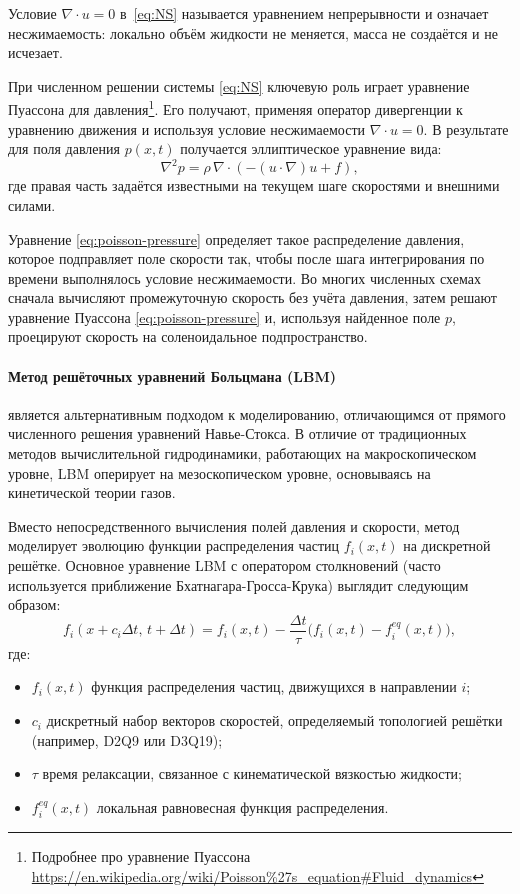 Условие \(\nabla\cdot u=0\) в~\eqref{eq:NS} называется уравнением
непрерывности и
означает несжимаемость: локально объём жидкости не меняется,
масса не создаётся и не исчезает.


При численном решении системы \eqref{eq:NS} ключевую роль играет
уравнение Пуассона для давления\footnote{Подробнее про уравнение Пуассона \url{https://en.wikipedia.org/wiki/Poisson\%27s\_equation\#Fluid\_dynamics}}. Его получают, применяя
оператор дивергенции к уравнению движения и используя условие
несжимаемости \(\nabla\cdot u=0\). В результате для поля
давления \(p(x,t)\) получается эллиптическое уравнение
вида:
\begin{equation}
  \nabla^{2} p
  =
  \rho\,
  \nabla\cdot\left(
  -(u\cdot\nabla)u
  + f
  \right),
  \label{eq:poisson-pressure}
\end{equation}
где правая часть задаётся известными на текущем шаге скоростями
и внешними силами.

Уравнение \eqref{eq:poisson-pressure} определяет такое
распределение давления, которое подправляет поле скорости так,
чтобы после шага интегрирования по времени выполнялось условие
несжимаемости. Во многих численных схемах сначала вычисляют промежуточную скорость без учёта давления,
затем решают уравнение Пуассона \eqref{eq:poisson-pressure} и,
используя найденное поле \(p\), проецируют скорость на
соленоидальное подпространство.

\paragraph{Метод решёточных уравнений Больцмана (LBM)} является альтернативным подходом к моделированию, отличающимся от прямого численного
решения уравнений Навье-Стокса. В отличие от традиционных методов вычислительной гидродинамики,
работающих на макроскопическом уровне, LBM оперирует на мезоскопическом уровне,
основываясь на кинетической теории газов.

Вместо непосредственного вычисления полей давления и скорости, метод
моделирует эволюцию функции распределения частиц \(f_i(x, t)\)
на дискретной решётке. Основное уравнение LBM с оператором столкновений
(часто используется приближение Бхатнагара-Гросса-Крука)
выглядит следующим образом:
\begin{equation}
  f_i(x + c_i \Delta t,\, t + \Delta t)
  = f_i(x, t)
  - \frac{\Delta t}{\tau}
  \bigl(f_i(x, t) - f_i^{eq}(x, t)\bigr),
  \label{eq:LBM}
\end{equation}
где:
\begin{itemize}
  \item \(f_i(x, t)\) \textemdash{} функция распределения частиц,
        движущихся в направлении \(i\);
  \item \(c_i\) \textemdash{} дискретный набор векторов скоростей,
        определяемый топологией решётки (например, D2Q9 или D3Q19);
  \item \(\tau\) \textemdash{} время релаксации, связанное с кинематической
        вязкостью жидкости;
  \item \(f_i^{eq}(x, t)\) \textemdash{} локальная равновесная
        функция распределения.
\end{itemize}

